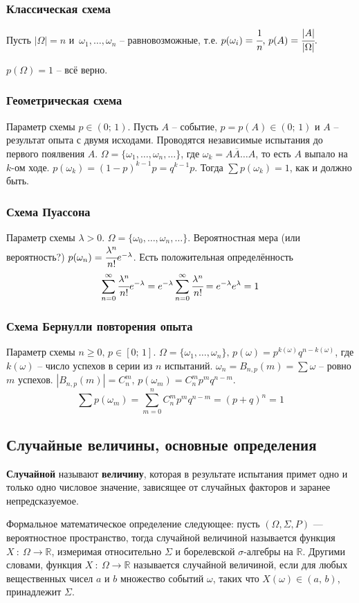 \documentclass{article}
\newcommand{\R}{\mathbb{R}}
\begin{document}
\subsubsection{Классическая схема}
Пусть $|\Omega|=n$ и $\,\omega_1,\dots,\omega_n$ -- равновозможные, т.е. $p(\omega_i)=\cfrac{1}{n},\,p(A)=\cfrac{|A|}{|\Omega|}.$ 

$p(\Omega)=1$ -- всё верно.
\subsubsection{Геометрическая схема}
Параметр схемы $p\in(0;\,1)$. Пусть $A$ -- событие, $p=p(A)\in(0;\,1)$ и $A$ -- результат опыта с двумя исходами. Проводятся независимые испытания до первого поялвения $A$. $\Omega=\{\omega_1,\dots,\omega_n,\dots\}$, где $\omega_k=\overline{AA\dots}A$, то есть $A$ выпало на $k$-ом ходе. $p(\omega_k)=(1-p)^{k-1}p=q^{k-1}p$. Тогда $\sum p(\omega_k)=1$, как и должно быть.
\subsubsection{Схема Пуассона}
Параметр схемы $\lambda>0$. $\Omega=\{\omega_0,\dots,\omega_n,\dots\}$. Вероятностная мера (или вероятность?) $p(\omega_n)=\cfrac{\lambda^n}{n!}e^{-\lambda}$. Есть положительная определённость $$ \sum_{n=0}^{\infty}\cfrac{\lambda^n}{n!}e^{-\lambda}=e^{-\lambda}\sum_{n=0}^{\infty}\cfrac{\lambda^n}{n!}=e^{-\lambda}e^{\lambda}=1 $$

\subsubsection{Схема Бернулли повторения опыта}
Параметр схемы $n\geq0,\,p\in[0;\,1]$. $\Omega=\{\omega_1,\dots,\omega_n\},\,p(\omega)=p^{k(\omega)}q^{n-k(\omega)}$, где $k(\omega)$ -- число успехов в серии из $n$ испытаний. $\omega_n=B_{n,p}(m)=\sum\omega$ -- ровно $m$ успехов. $|B_{n,p}(m)|=C^m_n,\, p(\omega_m)=C^m_n p^m q^{n-m}.$
$$ \sum p(\omega_m)=\sum_{m=0}^n C^m_n p^m q^{n-m}=(p+q)^n=1 $$
\subsection{Случайные величины, основные определения}
\textbf{Случайной} называют \textbf{величину}, которая в результате испытания примет одно и только одно числовое значение, зависящее от случайных факторов и заранее непредсказуемое.

Формальное математическое определение следующее: пусть $(\Omega,\Sigma,P)$ — вероятностное пространство, тогда случайной величиной называется функция $X\::\:\Omega\to\R$, измеримая относительно $\Sigma$ и борелевской $\sigma$-алгебры на $\R$. Другими словами, функция $X\::\:\Omega\to\R$ называется случайной величиной, если для любых вещественных чисел $a$ и $b$ множество событий $\omega$, таких что $X(\omega)\in(a,\,b)$, принадлежит $\Sigma$.
\end{document}
